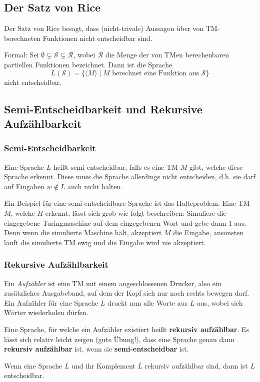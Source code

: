 \documentclass[a4paper,parskip=half*,DIV=7,fontsize=11pt]{scrartcl}
\newcommand\comp[1]{\overline#1}
\begin{document}
\subsection{Der Satz von Rice}
Der Satz von Rice besagt, dass (nicht-trivale) Aussagen über von TM-berechneten Funktionen nicht entscheidbar sind.

Formal: Sei $\emptyset \varsubsetneq \mathcal S \varsubsetneq \mathcal R$, wobei $\mathcal R$ die  Menge der von TMen berechenbaren partiellen Funktionen bezeichnet.  Dann ist die Sprache 
\[L(\mathcal S ) = \{\langle M \rangle \mid \text{$M$ berechnet eine Funktion aus $\mathcal S$}\}\]
nicht entscheidbar. 

\subsection{Semi-Entscheidbarkeit und Rekursive Aufzählbarkeit}
\subsubsection{Semi-Entscheidbarkeit}
Eine Sprache $L$ heißt semi-entscheidbar, falls es eine TM  $M$ gibt, welche diese Sprache erkennt. Diese muss die Sprache allerdings nicht entscheiden, d.h. sie darf auf Eingaben $w \notin L$ auch nicht halten.

Ein Beispiel für eine semi-entscheidbare Sprache ist das Halteproblem. Eine TM $M$, welche $H$ erkennt, lässt sich grob wie folgt beschreiben:  Simuliere die eingegebene Turingmaschine auf dem eingegebenen Wort und gebe dann 1 aus. Denn wenn die simulierte Maschine hält, akzeptiert $M$ die Eingabe, ansonsten läuft die simulierte TM ewig und die Eingabe wird nie akzeptiert.

\subsubsection{Rekursive Aufzählbarkeit}
Ein \emph{Aufzähler} ist eine TM mit einem angeschlossenen Drucker, also ein zusätzliches Ausgabeband, auf dem der Kopf sich nur nach rechts bewegen darf.  Ein Aufzähler für eine Sprache $L$ druckt nun alle Worte aus $L$ aus, wobei sich Wörter wiederholen dürfen.

Eine Sprache, für welche ein Aufzähler existiert heißt \textbf{rekursiv aufzählbar}. Es lässt sich relativ leicht zeigen (gute Übung!), dass eine Sprache genau dann \textbf{rekursiv aufzählbar} ist, wenn sie \textbf{semi-entscheidbar} ist.

Wenn eine Sprache $L$ und ihr Komplement $\comp{L}$ rekursiv aufzählbar sind, dann ist $L$ entscheidbar.
\end{document}
